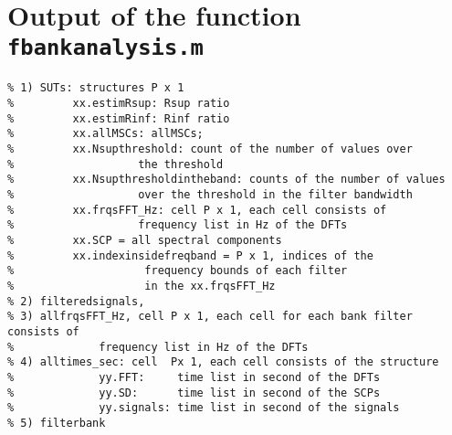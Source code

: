 \newpage\clearpage
\section{Output of the function {\tt fbankanalysis.m}}

\begin{verbatim}
% 1) SUTs: structures P x 1
%         xx.estimRsup: Rsup ratio
%         xx.estimRinf: Rinf ratio
%         xx.allMSCs: allMSCs;
%         xx.Nsupthreshold: count of the number of values over
%                   the threshold
%         xx.Nsupthresholdintheband: counts of the number of values
%                   over the threshold in the filter bandwidth
%         xx.frqsFFT_Hz: cell P x 1, each cell consists of
%                   frequency list in Hz of the DFTs
%         xx.SCP = all spectral components
%         xx.indexinsidefreqband = P x 1, indices of the
%                    frequency bounds of each filter
%                    in the xx.frqsFFT_Hz
% 2) filteredsignals, 
% 3) allfrqsFFT_Hz, cell P x 1, each cell for each bank filter consists of
%             frequency list in Hz of the DFTs
% 4) alltimes_sec: cell  Px 1, each cell consists of the structure
%             yy.FFT:     time list in second of the DFTs
%             yy.SD:      time list in second of the SCPs
%             yy.signals: time list in second of the signals
% 5) filterbank



\end{verbatim}



